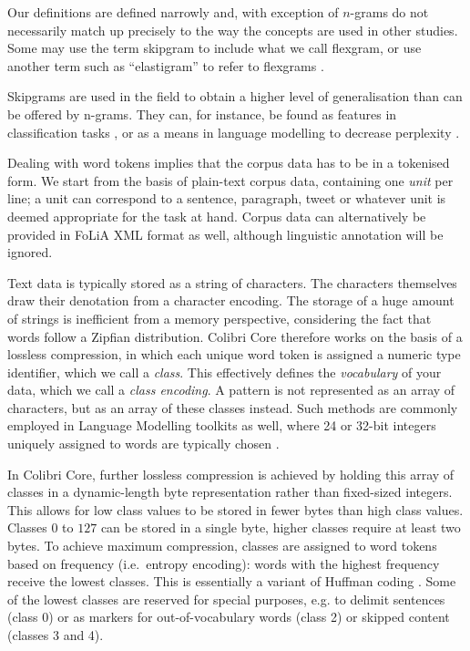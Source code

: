 Our definitions are defined narrowly and, with exception of $n$-grams do not
necessarily match up precisely to the way the concepts are used in other studies. Some
may use the term skipgram to include what we call flexgram, or use another term
such as ``elastigram'' to refer to flexgrams \citep{ForsythS14}.

Skipgrams are used in the field to obtain a higher level of generalisation than
can be offered by n-grams. They can, for instance, be found as features in
classification tasks \citep{DHONDT}, or as a means in language modelling to
decrease perplexity \citep{Guthrie06,COCOCPYP}.

Dealing with word tokens implies that the corpus data has to be in a
tokenised form. We start from the basis of plain-text corpus data, containing one
\emph{unit} per line; a unit can correspond to a sentence, paragraph, tweet
or whatever unit is deemed appropriate for the task at hand. Corpus data can
alternatively be provided in FoLiA XML format \citep{FOLIAPAPER} as well, although linguistic
annotation will be ignored.

Text data is typically stored as a string of characters. The characters
themselves draw their denotation from a character encoding. The storage of a
huge amount of strings is inefficient from a memory perspective, considering
the fact that words follow a Zipfian distribution. Colibri Core therefore works
on the basis of a lossless compression, in which each unique word token is
assigned a numeric type identifier, which we call a \emph{class}. This
effectively defines the \emph{vocabulary} of your data, which we call a
\emph{class encoding}. A pattern is not represented as an array of
characters, but as an array of these classes instead. Such methods are commonly
employed in Language Modelling toolkits as well, where 24 or 32-bit integers
uniquely assigned to words are typically chosen \citep{Guthrie2010}.

In Colibri Core, further lossless compression is achieved by holding this array of
classes in a dynamic-length byte representation rather than fixed-sized
integers. This allows  for low class values to be stored in fewer bytes than
high class values. Classes $0$ to $127$ can be stored in a single byte, higher
classes require at least two bytes. To achieve maximum compression, classes are
assigned to word tokens based on frequency (i.e.\ entropy encoding): words with
the highest frequency receive the lowest classes.  This is essentially a
variant of Huffman coding \citep{HUFFMAN}. Some of the lowest classes are
reserved for special purposes, e.g. to delimit sentences (class 0) or as
markers for out-of-vocabulary words (class 2) or skipped content (classes 3 and
4).


